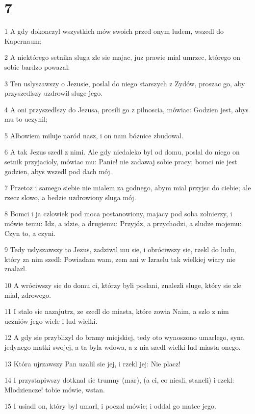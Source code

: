 \chapter{7}

\par 1 A gdy dokonczyl wszystkich mów swoich przed onym ludem, wszedl do Kapernaum;
\par 2 A niektórego setnika sluga zle sie majac, juz prawie mial umrzec, którego on sobie bardzo powazal.
\par 3 Ten uslyszawszy o Jezusie, poslal do niego starszych z Zydów, proszac go, aby przyszedlszy uzdrowil sluge jego.
\par 4 A oni przyszedlszy do Jezusa, prosili go z pilnoscia, mówiac: Godzien jest, abys mu to uczynil;
\par 5 Albowiem miluje naród nasz, i on nam bóznice zbudowal.
\par 6 A tak Jezus szedl z nimi. Ale gdy niedaleko byl od domu, poslal do niego on setnik przyjacioly, mówiac mu: Panie! nie zadawaj sobie pracy; bomci nie jest godzien, abys wszedl pod dach mój.
\par 7 Przetoz i samego siebie nie mialem za godnego, abym mial przyjsc do ciebie; ale rzecz slowo, a bedzie uzdrowiony sluga mój.
\par 8 Bomci i ja czlowiek pod moca postanowiony, majacy pod soba zolnierzy, i mówie temu: Idz, a idzie, a drugiemu: Przyjdz, a przychodzi, a sludze mojemu: Czyn to, a czyni.
\par 9 Tedy uslyszawszy to Jezus, zadziwil mu sie, i obróciwszy sie, rzekl do ludu, który za nim szedl: Powiadam wam, zem ani w Izraelu tak wielkiej wiary nie znalazl.
\par 10 A wróciwszy sie do domu ci, którzy byli poslani, znalezli sluge, który sie zle mial, zdrowego.
\par 11 I stalo sie nazajutrz, ze szedl do miasta, które zowia Naim, a szlo z nim uczniów jego wiele i lud wielki.
\par 12 A gdy sie przyblizyl do bramy miejskiej, tedy oto wynoszono umarlego, syna jedynego matki swojej, a ta byla wdowa, a z nia szedl wielki lud miasta onego.
\par 13 Która ujrzawszy Pan uzalil sie jej, i rzekl jej: Nie placz!
\par 14 I przystapiwszy dotknal sie trumny (mar), (a ci, co niesli, staneli) i rzekl: Mlodziencze! tobie mówie, wstan.
\par 15 I usiadl on, który byl umarl, i poczal mówic; i oddal go matce jego.
